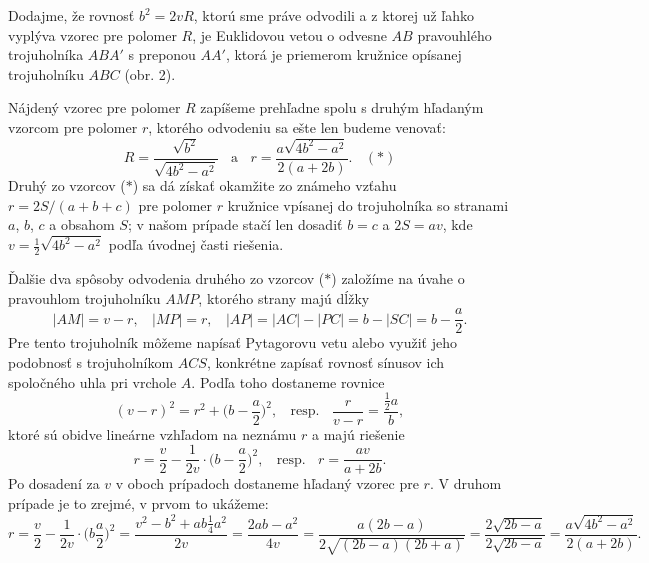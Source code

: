 \documentclass[11pt,a4paper,oneside,final]{book}
\begin{document}
Dodajme, že rovnosť $b^2 = 2vR$, ktorú sme práve odvodili a z ktorej už ľahko vyplýva vzorec pre polomer $R$, je Euklidovou vetou o odvesne $AB$ pravouhlého trojuholníka $ABA'$ s preponou $AA'$, ktorá je priemerom kružnice opísanej trojuholníku $ABC$ (obr. 2).

Nájdený vzorec pre polomer $R$ zapíšeme prehľadne spolu s druhým hľadaným vzorcom pre polomer $r$, ktorého odvodeniu sa ešte len budeme venovať:
$$R =\frac{\sqrt{b^2}}{\sqrt{4b^2 - a^2}}\ \ \ \ \text{a}\ \ \ \  r = \frac{a\sqrt{4b^2-a^2}}{2(a+2b)}.\ \ \ \  (\ast)$$
Druhý zo vzorcov ($\ast$) sa dá získať okamžite zo známeho vzťahu $r = 2S/(a + b + c)$ pre polomer $r$ kružnice vpísanej do trojuholníka so stranami $a$, $b$, $c$ a obsahom $S$;
v našom prípade stačí len dosadiť $b = c$ a $2S = av$, kde $v = \frac{1}{2}\sqrt{4b^2 - a^2}$ podľa úvodnej časti riešenia.

Ďalšie dva spôsoby odvodenia druhého zo vzorcov ($\ast$) založíme na úvahe o pravouhlom trojuholníku $AMP$, ktorého strany majú dĺžky
$$|AM| = v -r, \ \ \ \ |MP| = r, \ \ \ \ |AP| = |AC| - |PC| = b - |SC| = b - \frac{a}{2}.$$
Pre tento trojuholník môžeme napísať Pytagorovu vetu alebo využiť jeho podobnosť s trojuholníkom $ACS$, konkrétne zapísať rovnosť sínusov ich spoločného uhla pri vrchole $A$. Podľa toho dostaneme rovnice
$$(v - r)^2= r^2+\big(b -\frac{a}{2}\big)^2, \ \ \ \ \text{resp.} \ \ \ \ \frac{r}{v-r}=  \frac{\frac{1}{2}a}{b},$$
ktoré sú obidve lineárne vzhľadom na neznámu $r$ a majú riešenie
$$r = \frac{v}{2}-\frac{1}{2v}\cdot \big( b - \frac{a}{2} \big)^2, \ \ \ \ \text{resp.}\ \ \ \  r=
\frac{av}{a+2b}.$$
Po dosadení za $v$ v oboch prípadoch dostaneme hľadaný vzorec pre $r$. V druhom prípade
je to zrejmé, v prvom to ukážeme:
$$r =\frac{v}{2}  - \frac{1}{2v} \cdot \big(b \frac{a}{2}\big)^2= \frac{v^2 - b^2 + ab \frac{1}{4}a^2}{2v}=\frac{2ab - a^2}{4v}=\frac{a(2b - a)}{2\sqrt{(2b -a)(2b + a)}}=\frac{2\sqrt{2b-a}}{2\sqrt{2b-a}}=\frac{a \sqrt{4b^2 -a^2}}{2(a + 2b)}.$$
\end{document}
